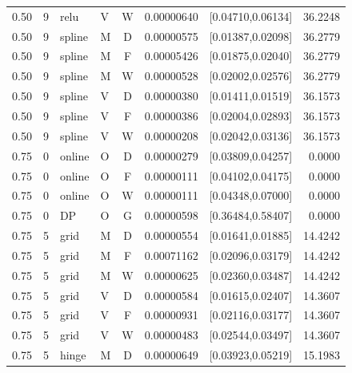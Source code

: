 \begin{longtable}{rrllcrrr}
0.50 & 9 & relu & V & W & 0.00000640 & [0.04710,0.06134] & 36.2248 \\

0.50 & 9 & spline & M & D & 0.00000575 & [0.01387,0.02098] & 36.2779 \\

0.50 & 9 & spline & M & F & 0.00005426 & [0.01875,0.02040] & 36.2779 \\

0.50 & 9 & spline & M & W & 0.00000528 & [0.02002,0.02576] & 36.2779 \\

0.50 & 9 & spline & V & D & 0.00000380 & [0.01411,0.01519] & 36.1573 \\

0.50 & 9 & spline & V & F & 0.00000386 & [0.02004,0.02893] & 36.1573 \\

0.50 & 9 & spline & V & W & 0.00000208 & [0.02042,0.03136] & 36.1573 \\

0.75 & 0 & online & O & D & 0.00000279 & [0.03809,0.04257] & 0.0000 \\

0.75 & 0 & online & O & F & 0.00000111 & [0.04102,0.04175] & 0.0000 \\

0.75 & 0 & online & O & W & 0.00000111 & [0.04348,0.07000] & 0.0000 \\

0.75 & 0 & DP & O & G & 0.00000598 & [0.36484,0.58407] & 0.0000 \\

0.75 & 5 & grid & M & D & 0.00000554 & [0.01641,0.01885] & 14.4242 \\

0.75 & 5 & grid & M & F & 0.00071162 & [0.02096,0.03179] & 14.4242 \\

0.75 & 5 & grid & M & W & 0.00000625 & [0.02360,0.03487] & 14.4242 \\

0.75 & 5 & grid & V & D & 0.00000584 & [0.01615,0.02407] & 14.3607 \\

0.75 & 5 & grid & V & F & 0.00000931 & [0.02116,0.03177] & 14.3607 \\

0.75 & 5 & grid & V & W & 0.00000483 & [0.02544,0.03497] & 14.3607 \\

0.75 & 5 & hinge & M & D & 0.00000649 & [0.03923,0.05219] & 15.1983 \\


\end{longtable}
